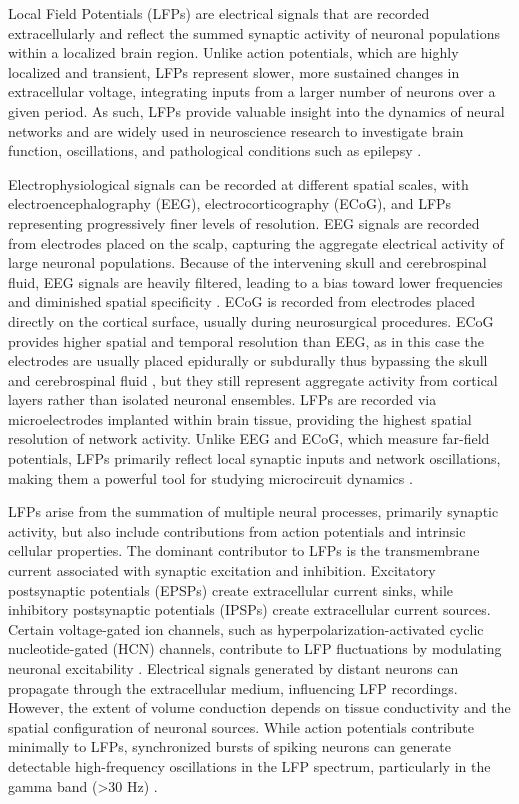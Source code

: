 \documentclass{article}
\begin{document}
Local Field Potentials (LFPs) are electrical signals that are recorded extracellularly and reflect the summed synaptic activity of neuronal populations within a localized brain region. Unlike action potentials, which are highly localized and transient, LFPs represent slower, more sustained changes in extracellular voltage, integrating inputs from a larger number of neurons over a given period. As such, LFPs provide valuable insight into the dynamics of neural networks and are widely used in neuroscience research to investigate brain function, oscillations, and pathological conditions such as epilepsy \cite{buzsaki2012}.

Electrophysiological signals can be recorded at different spatial scales, with electroencephalography (EEG), electrocorticography (ECoG), and LFPs representing progressively finer levels of resolution. EEG signals are recorded from electrodes placed on the scalp, capturing the aggregate electrical activity of large neuronal populations. Because of the intervening skull and cerebrospinal fluid, EEG signals are heavily filtered, leading to a bias toward lower frequencies and diminished spatial specificity \cite{buzsaki2012, einevoll2022}. ECoG is recorded from electrodes placed directly on the cortical surface, usually during neurosurgical procedures. ECoG provides higher spatial and temporal resolution than EEG, as in this case the electrodes are usually placed epidurally or subdurally thus bypassing the skull and cerebrospinal fluid \cite{moon2024}, but they still represent aggregate activity from cortical layers rather than isolated neuronal ensembles. LFPs are recorded via microelectrodes implanted within brain tissue, providing the highest spatial resolution of network activity. Unlike EEG and ECoG, which measure far-field potentials, LFPs primarily reflect local synaptic inputs and network oscillations, making them a powerful tool for studying microcircuit dynamics \cite{telenczuk2014}.

LFPs arise from the summation of multiple neural processes, primarily synaptic activity, but also include contributions from action potentials and intrinsic cellular properties. The dominant contributor to LFPs is the transmembrane current associated with synaptic excitation and inhibition. Excitatory postsynaptic potentials (EPSPs) create extracellular current sinks, while inhibitory postsynaptic potentials (IPSPs) create extracellular current sources. Certain voltage-gated ion channels, such as hyperpolarization-activated cyclic nucleotide-gated (HCN) channels, contribute to LFP fluctuations by modulating neuronal excitability \cite{sinha2015}. Electrical signals generated by distant neurons can propagate through the extracellular medium, influencing LFP recordings. However, the extent of volume conduction depends on tissue conductivity and the spatial configuration of neuronal sources. While action potentials contribute minimally to LFPs, synchronized bursts of spiking neurons can generate detectable high-frequency oscillations in the LFP spectrum, particularly in the gamma band (>30 Hz) \cite{mcafee2018}.
\end{document}
